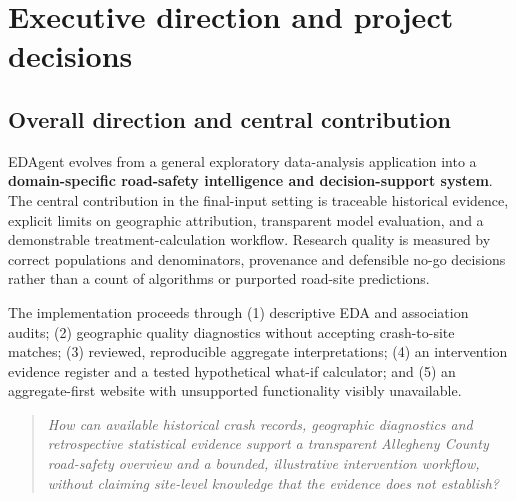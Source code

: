 \documentclass[11pt,a4paper,openany]{report}
\newcommand{\qnote}[1]{\begin{quote}\itshape #1\end{quote}}
\begin{document}
\tableofcontents
\clearpage
{}

\chapter{Executive direction and project decisions}
\section{Overall direction and central contribution}
EDAgent evolves from a general exploratory data-analysis application into a \textbf{domain-specific road-safety intelligence and decision-support system}. The central contribution in the final-input setting is traceable historical evidence, explicit limits on geographic attribution, transparent model evaluation, and a demonstrable treatment-calculation workflow. Research quality is measured by correct populations and denominators, provenance and defensible no-go decisions rather than a count of algorithms or purported road-site predictions.

The implementation proceeds through (1) descriptive EDA and association audits; (2) geographic quality diagnostics without accepting crash-to-site matches; (3) reviewed, reproducible aggregate interpretations; (4) an intervention evidence register and a tested hypothetical what-if calculator; and (5) an aggregate-first website with unsupported functionality visibly unavailable.

\qnote{How can available historical crash records, geographic diagnostics and retrospective statistical evidence support a transparent Allegheny County road-safety overview and a bounded, illustrative intervention workflow, without claiming site-level knowledge that the evidence does not establish?}
\end{document}
